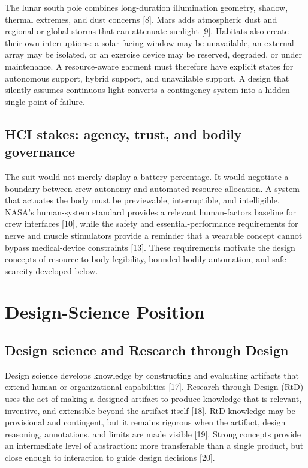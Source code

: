 \documentclass[runningheads]{llncs}
\begin{document}
The lunar south pole combines long-duration illumination geometry, shadow, thermal extremes, and dust concerns [8]. Mars adds atmospheric dust and regional or global storms that can attenuate sunlight [9]. Habitats also create their own interruptions: a solar-facing window may be unavailable, an external array may be isolated, or an exercise device may be reserved, degraded, or under maintenance. A resource-aware garment must therefore have explicit states for autonomous support, hybrid support, and unavailable support. A design that silently assumes continuous light converts a contingency system into a hidden single point of failure.

\subsection{HCI stakes: agency, trust, and bodily governance}

The suit would not merely display a battery percentage. It would negotiate a boundary between crew autonomy and automated resource allocation. A system that actuates the body must be previewable, interruptible, and intelligible. NASA's human-system standard provides a relevant human-factors baseline for crew interfaces [10], while the safety and essential-performance requirements for nerve and muscle stimulators provide a reminder that a wearable concept cannot bypass medical-device constraints [13]. These requirements motivate the design concepts of resource-to-body legibility, bounded bodily automation, and safe scarcity developed below.

\section{Design-Science Position}

\subsection{Design science and Research through Design}

Design science develops knowledge by constructing and evaluating artifacts that extend human or organizational capabilities [17]. Research through Design (RtD) uses the act of making a designed artifact to produce knowledge that is relevant, inventive, and extensible beyond the artifact itself [18]. RtD knowledge may be provisional and contingent, but it remains rigorous when the artifact, design reasoning, annotations, and limits are made visible [19]. Strong concepts provide an intermediate level of abstraction: more transferable than a single product, but close enough to interaction to guide design decisions [20].
\end{document}
